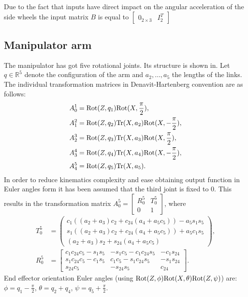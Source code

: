Due to the fact that inputs have direct impact on the angular acceleration of the side wheels the input matrix $B$ is equal to $\begin{bmatrix}
0_{2 \times 3} & I_2^T
\end{bmatrix}$ 
\subsection{Manipulator arm}
The manipulator has got five rotational joints. Its structure is shown in. %
Let $q\in \mathbb{R}^5$ denote the configuration of the arm and $a_2, \dots, a_5$ the lengths of the links. The individual transformation matrices in Denavit-Hartenberg convention are as follows:
\begin{align}
A_0^1 &= \mathrm{Rot}(Z, q_1)\mathrm{Rot}(X, \frac{\pi}{2}),\\
A_1^2 &= \mathrm{Rot}(Z, q_2)\mathrm{Tr} (X, a_2)\mathrm{Rot}(X, -\frac{\pi}{2}),\\
A_2^3 &= \mathrm{Rot}(Z, q_3)\mathrm{Tr} (X, a_3)\mathrm{Rot}(X, \frac{\pi}{2}),\\
A_3^4 &= \mathrm{Rot}(Z, q_4)\mathrm{Tr} (X, a_4)\mathrm{Rot}(X, -\frac{\pi}{2}),\\
A_4^5 &= \mathrm{Rot}(Z, q_5)\mathrm{Tr} (X, a_5).
\end{align}
In order to reduce kinematics complexity and ease obtaining output function in Euler angles form it has been assumed that the third joint is fixed to $0$. This results in the transformation matrix $
A_0^5=\begin{bmatrix}
R_0^5 & T_0^5\\
0 & 1
\end{bmatrix}$, 
where
\begin{align}
T_0^5 &= \begin{pmatrix}
c_1\left((a_2+a_3)c_2 + c_{24}(a_4+a_5c_5)\right) - a_5s_1s_5\\
s_1\left((a_2+a_3)c_2 + c_{24}(a_4+a_5c_5)\right) + a_5c_1s_5\\
    (a_2+a_3)s_2 + s_{24}(a_4+a_5c_5)
\end{pmatrix},\\
R_0^5 &= \begin{bmatrix}
c_1c_{24}c_5-s_1s_5 & -s_1c_5-c_1c_{24}s_5 & -c_1s_{24}\\
s_1c_{24}c_5-c_1s_5 &  c_1c_5-s_1c_{24}s_5 & -s_1s_{24}\\
s_{24}c_5           & -s_{24}s_5           &  c_{24}
\end{bmatrix}.
\end{align}
End effector orientation Euler angles (using $\mathrm{Rot}(Z,\phi)\mathrm{Rot}(X, \theta)\mathrm{Rot}(Z, \psi)$) are: $\phi=q_1-\frac{\pi}{2}$, $\theta=q_2+q_4$, $\psi=q_5+\frac{\pi}{2}$.

